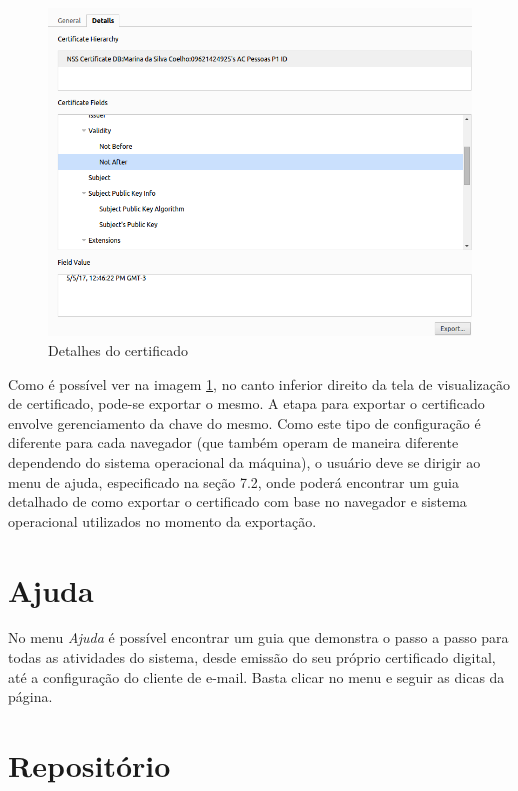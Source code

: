 \begin{figure}[ht]
     \centering
     \includegraphics[scale=0.5]{images/details.png}
     \caption{Detalhes do certificado}
     \label{fig:detailscert}
\end{figure}

Como é possível ver na imagem \ref{fig:detailscert}, no canto inferior direito da tela de visualização de certificado, pode-se exportar o mesmo. A etapa para exportar o certificado envolve gerenciamento da chave do mesmo. Como este tipo de configuração é diferente para cada navegador (que também operam de maneira diferente dependendo do sistema operacional da máquina), o usuário deve se dirigir ao menu de ajuda, especificado na seção 7.2, onde poderá encontrar um guia detalhado de como exportar o certificado com base no navegador e sistema operacional utilizados no momento da exportação.

\section{Ajuda}

No menu \textit{Ajuda} é possível encontrar um guia que demonstra o passo a passo para todas as atividades do sistema, desde emissão do seu próprio certificado digital, até a configuração do cliente de e-mail. Basta clicar no menu e seguir as dicas da página.

\section{Repositório}

